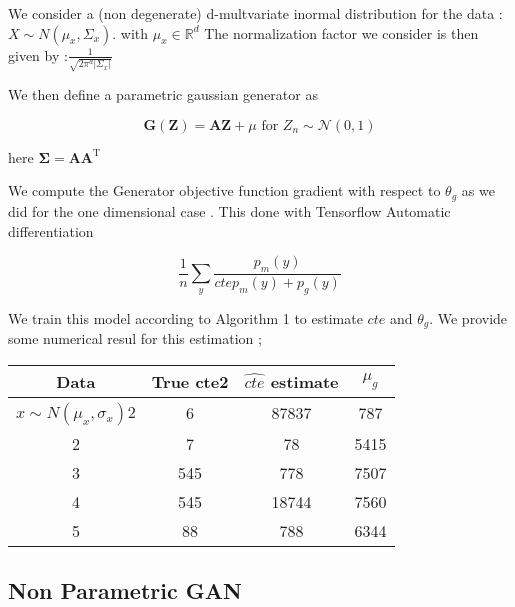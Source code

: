 \documentclass{article}
\begin{document}
We consider a (non degenerate) d-multvariate inormal distribution for the data : $ X  \sim N(\mu_{x} , \Sigma_{x} ) $.  with $\mu_{x}   \in  \mathbb{R}^{d}$   The normalization factor we consider is then given by :$ \frac{1}{\sqrt{2\pi^{d} |\Sigma_{x}|}} $

We then define a parametric gaussian generator as  

\begin{equation}\mathbf{G(Z) }=\boldsymbol{A Z}+\mu \text { for } Z_{n} \sim \mathcal{N}(0,1)\end{equation}

here $\mathbf{\Sigma}=\boldsymbol{A} \boldsymbol{A}^{\mathrm{T}}$

We compute the  Generator objective function gradient  with respect to   $\theta_{g}$ as we did for the one dimensional case . This done with Tensorflow Automatic differentiation
 
\begin{equation}
 \frac{1}{n}\sum_{y} \frac{ p_{m}(y)}{ctep_{m}(y)+p_{g}(y)}  
\end{equation}


We train this model  according to Algorithm 1 to estimate $cte$ and  $\theta_{g}$.  We provide some numerical resul for this estimation ;

\begin{center}
 \begin{tabular}{||c c c c||} 
 \hline
 Data & True cte2 & $\hat{cte}$ estimate & $\mu _{g}$  \\ [0.5ex] 
 \hline\hline
  $ x \sim N(\mu_{x} , \sigma_{x} ) $2 & 6 & 87837 & 787 \\ 
 \hline
 2 & 7 & 78 & 5415 \\
 \hline
 3 & 545 & 778 & 7507 \\
 \hline
 4 & 545 & 18744 & 7560 \\
 \hline
 5 & 88 & 788 & 6344 \\ [1ex] 
 \hline
\end{tabular}
\end{center}

\subsection{Non Parametric GAN}
\end{document}
